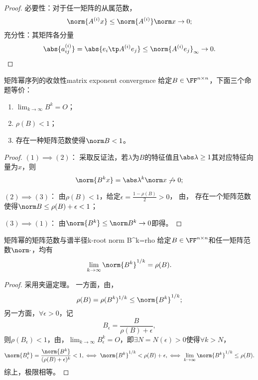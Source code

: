 \begin{proof}
    必要性：对于任一矩阵的从属范数，
    \[
        \norm{A^{(i)}x}\leq\norm{A^{(i)}}\norm x\to0;
    \]
    充分性：其矩阵各分量
    \[
        \abs{a_{ij}^{(i)}}=\abs{e_i\tp A^{(i)}e_j}\leq\norm{A^{(i)}e_j}_\infty\to 0.
        \qedhere
    \]
\end{proof}

\begin{theorem}
    {矩阵幂序列的收敛性}{matrix exponent convergence}
    给定$B\in\FF^{n\times n}$，下面三个命题等价：
    \begin{enumerate}
        \item $\lim_{k\to\infty}B^k=O$；
        \item $\rho(B)<1$；
        \item 存在一种矩阵范数使得$\norm B<1$。
    \end{enumerate}
\end{theorem}

\begin{proof}
    $(1)\implies(2)$：
    采取反证法，若$\lambda$为$B$的特征值且$\abs\lambda\geq 1$其对应特征向量为$x$，则 
    \[
        \norm{B^kx}=\abs\lambda^k\norm x\not\to 0;
    \]

    $(2)\implies(3)$：
    由$\rho(B)<1$，给定$\epsilon=\frac{1-\rho(B)}2>0$，
    由，
    存在一个矩阵范数使得$\norm B\leq\rho(B)+\epsilon<1$；

    $(3)\implies(1)$：
    由$\norm{B^k}\leq\norm B^k\to0$即得。
\end{proof}

\begin{theorem}
    {矩阵幂的矩阵范数与谱半径}{k-root norm B^k=rho}
    给定$B\in\FF^{n\times n}$和任一矩阵范数$\norm\cdot$，均有
    \begin{equation}
        \lim_{k\to\infty}\norm{B^k}^{1/k}=\rho(B).
    \end{equation}
\end{theorem}

\begin{proof}
    采用夹逼定理。
    一方面，由，
    \[
        \rho(B)=\rho(B^k)^{1/k}\leq\norm{B^k}^{1/k};
    \]
    另一方面，$\forall\epsilon>0$，记 
    \[
        B_\epsilon=\frac{B}{\rho(B)+\epsilon},
    \]
    则$\rho(B_\epsilon)<1$，由，$\lim_{k\to\infty}B_\epsilon^k=O$，即$\exists N=N(\epsilon)>0$使得$\forall k>N$，
    \[
        \norm{B_\epsilon^k}=\frac{\norm{B^k}}{(\rho(B)+\epsilon)^k}<1,\iff\norm{B^k}^{1/k}<\rho(B)+\epsilon,\iff\lim_{k\to\infty}\norm{B^k}^{1/k}\leq\rho(B).
    \]
    综上，极限相等。    
\end{proof}

